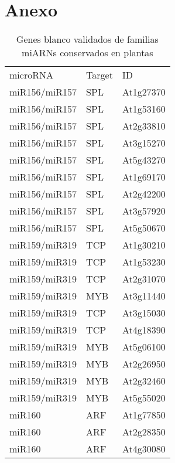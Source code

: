 \setcounter{chapter}{9}
\chapter*{Anexo} 
\setcounter{figure}{0}
\setcounter{table}{0}
\setcounter{section}{0}

\graphicspath{{Appendix/Figs/}}

\begin{table}
\tiny
\centering
\caption{Genes blanco validados de familias miARNs conservados en plantas}
\label{table:NAR_table_S3}
\begin{tabular}{lll}
microRNA      & Target       & ID        \\
miR156/miR157 & SPL          & At1g27370 \\
miR156/miR157 & SPL          & At1g53160 \\
miR156/miR157 & SPL          & At2g33810 \\
miR156/miR157 & SPL          & At3g15270 \\
miR156/miR157 & SPL          & At5g43270 \\
miR156/miR157 & SPL          & At1g69170 \\
miR156/miR157 & SPL          & At2g42200 \\
miR156/miR157 & SPL          & At3g57920 \\
miR156/miR157 & SPL          & At5g50670 \\
miR159/miR319 & TCP          & At1g30210 \\
miR159/miR319 & TCP          & At1g53230 \\
miR159/miR319 & TCP          & At2g31070 \\
miR159/miR319 & MYB          & At3g11440 \\
miR159/miR319 & TCP          & At3g15030 \\
miR159/miR319 & TCP          & At4g18390 \\
miR159/miR319 & MYB          & At5g06100 \\
miR159/miR319 & MYB          & At2g26950 \\
miR159/miR319 & MYB          & At2g32460 \\
miR159/miR319 & MYB          & At5g55020 \\
miR160        & ARF          & At1g77850 \\
miR160        & ARF          & At2g28350 \\
miR160        & ARF          & At4g30080 \\

\end{tabular}
\end{table}
